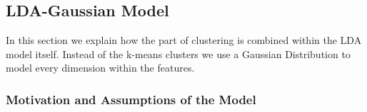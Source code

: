 \documentclass[11pt,a4paper]{article}
\begin{document}
% 
%  
% 
% 

\subsection{LDA-Gaussian Model}
In this section we explain how the part of clustering is combined within the LDA model itself. Instead of the k-means clusters we use a Gaussian Distribution to model every dimension within the features.


\subsubsection{Motivation and Assumptions of the Model}
  
\end{document}
